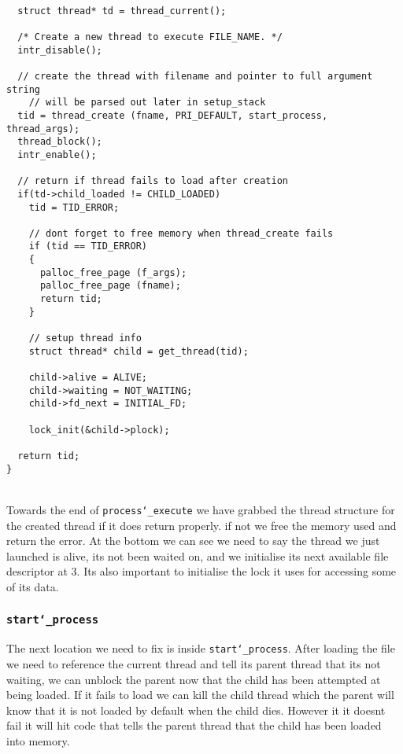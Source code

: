 \documentclass[]{article}
\begin{document}
		\lstset{language=C, tabsize=2}  
		    \begin{lstlisting} 
	 
  struct thread* td = thread_current();

  /* Create a new thread to execute FILE_NAME. */
  intr_disable();
  
  // create the thread with filename and pointer to full argument string
	// will be parsed out later in setup_stack
  tid = thread_create (fname, PRI_DEFAULT, start_process, thread_args);
  thread_block();
  intr_enable();
  
  // return if thread fails to load after creation
  if(td->child_loaded != CHILD_LOADED)
  	tid = TID_ERROR;

	// dont forget to free memory when thread_create fails  
	if (tid == TID_ERROR)
	{
	  palloc_free_page (f_args); 	
	  palloc_free_page (fname); 		  
	  return tid;	  
	}

	// setup thread info
	struct thread* child = get_thread(tid);
	
	child->alive = ALIVE;
	child->waiting = NOT_WAITING;
	child->fd_next = INITIAL_FD;

	lock_init(&child->plock);
	
  return tid;
}	 
\end{lstlisting}
\newpage
\textbf{}\\
Towards the end of \texttt{process\char`_execute} we have grabbed the thread structure for the created thread if it does return properly. if not we free the memory used and return the error. At the bottom we can see we need to say the thread we just launched is alive, its not been waited on, and we initialise its next available file descriptor at 3. Its also important to initialise the lock it uses for accessing some of its data.\\


 \subsubsection{\texttt{start\char`_process}}

The next location we need to fix is inside \texttt{start\char`_process}. After loading the file we need to reference the current thread and tell its parent thread that its not waiting, we can unblock the parent now that the child has been attempted at being loaded. If it fails to load we can kill the child thread which the parent will know that it is not loaded by default when the child dies. However it it doesnt fail it will hit code that tells the parent thread that the child has been loaded into memory.
\end{document}
